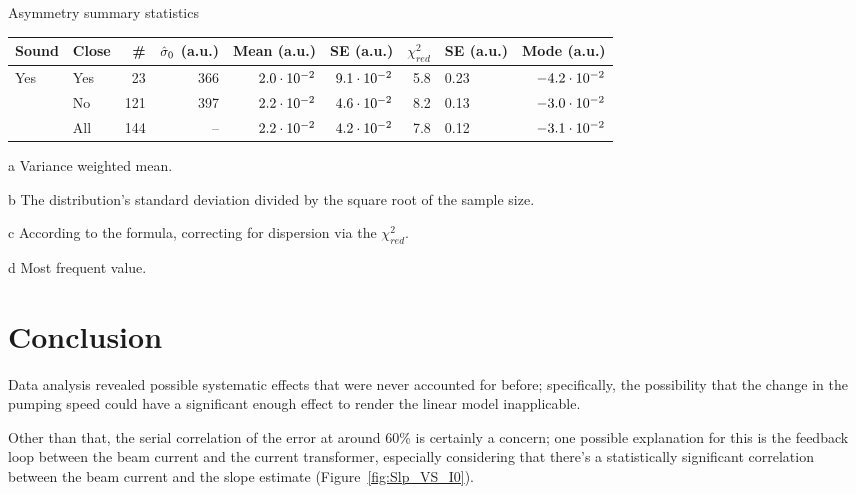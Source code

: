 \documentclass{article}
\begin{document}
\begin{center}
	\begin{threeparttable}[H]
		\centering
		\caption{Asymmetry summary statistics\label{tbl:AyySumStat}}
		\begin{tabular}{llrrrrrlr}
			\hline\hline
			Sound                & Close &  \# & $\CS*[0]$ (a.u.) & Mean\tnote{a} (a.u.) & SE\tnote{b} (a.u.) & $\chi^2_{red}$ & SE\tnote{c} (a.u.) & Mode\tnote{d} (a.u.) \\ \hline
			\multirow{3}{*}{Yes} & Yes   &  23 &              366 &       $2.0\cdot10^{-2}$ &     $9.1\cdot10^{-2}$ &            5.8 & 0.23               &      $-4.2\cdot10^{-2}$ \\
			& No    & 121 &              397 &       $2.2\cdot10^{-2}$ &     $4.6\cdot10^{-2}$ &            8.2 & 0.13               &      $-3.0\cdot10^{-2}$ \\
			& All   & 144 &               -- &       $2.2\cdot10^{-2}$ &     $4.2\cdot10^{-2}$ &            7.8 & 0.12               &      $-3.1\cdot10^{-2}$ \\ \hline
		\end{tabular}
		\begin{tablenotes}
			\item[a]{Variance weighted mean.}
			\item[b]{The distribution's standard deviation divided by the square root of the sample size.}
			\item[c]{According to the formula, correcting for dispersion via the $\chi^2_{red}$.}
			\item[d]{Most frequent value.}
		\end{tablenotes}
	\end{threeparttable}
\end{center}


\section{Conclusion}
Data analysis revealed possible systematic effects that were never accounted for before; specifically, the possibility that the change in the pumping speed could have a significant enough effect to render the linear model inapplicable. 

Other than that, the serial correlation of the error at around 60\% is certainly a concern; one possible explanation for this is the feedback loop between the beam current and the current transformer, especially considering that there's a statistically significant correlation between the beam current and the slope estimate (Figure~\ref{fig:Slp_VS_I0}). 
\end{document}
